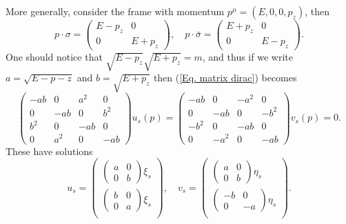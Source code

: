 \documentclass[11pt]{article}
\theoremstyle{definition}
\begin{document}
More generally, consider the frame with momentum $p^\mu = (E, 0,0,p_z)$, then 
\begin{equation}
    p\cdot \sigma = 
    \begin{pmatrix}
        E - p_z & 0 \\
        0 & E + p_z 
    \end{pmatrix}, \quad
    p\cdot \bar{\sigma} = 
    \begin{pmatrix}
        E + p_z & 0 \\
        0 & E - p_z 
    \end{pmatrix}.
\end{equation}
One should notice that $\sqrt{E-p_z}\sqrt{E+p_z} = m$, and thus if we write $a=\sqrt{E-p-z}$ and $b=\sqrt{E+p_z}$ then (\ref{Eq. matrix dirac}) becomes
\begin{equation}
    \begin{pmatrix}
        -ab & 0 & a^2 & 0 \\
        0 &-ab& 0 & b^2 \\
        b^2 & 0 & -ab &0 \\
        0&a^2&0&-ab
    \end{pmatrix}u_s(p) = 
    \begin{pmatrix}
        -ab & 0 & -a^2 & 0 \\
        0 &-ab& 0 & -b^2 \\
        -b^2 & 0 & -ab &0 \\
        0&-a^2&0&-ab
    \end{pmatrix}v_s(p) = 0.
\end{equation}
These have solutions 
\begin{equation}
    u_s = 
    \begin{pmatrix}
        \begin{pmatrix}
            a &0\\
            0& b
        \end{pmatrix}\xi_s\\
        \begin{pmatrix}
            b &0\\
            0& a
        \end{pmatrix}\xi_s\\
    \end{pmatrix}, \quad
    v_s = 
    \begin{pmatrix}
        \begin{pmatrix}
            a &0\\
            0& b
        \end{pmatrix}\eta_s\\
        \begin{pmatrix}
            -b &0\\
            0& -a
        \end{pmatrix}\eta_s\\
    \end{pmatrix}.
\end{equation}
\end{document}
